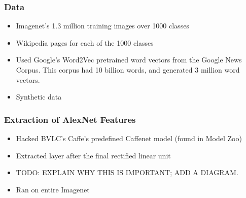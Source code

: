 \documentclass{beamer}
\begin{document}
\begin{frame}
  \frametitle{Data}
  \begin{itemize}
  \item Imagenet's 1.3 million training images over 1000 classes
  \item Wikipedia pages for each of the 1000 classes
  \item Used Google's Word2Vec pretrained word vectors from the Google News Corpus.
	This corpus had 10 billion words, and generated 3 million word vectors.
  \item Synthetic data
  \end{itemize}
\end{frame}

\begin{frame}
  \frametitle{Extraction of AlexNet Features}
  \begin{itemize}
    \item Hacked BVLC's Caffe's predefined Caffenet model (found in Model Zoo)
    \item Extracted layer after the final rectified linear unit
    \item TODO: EXPLAIN WHY THIS IS IMPORTANT; ADD A DIAGRAM.
    \item Ran on entire Imagenet
  \end{itemize}
\end{frame}
\end{document}
